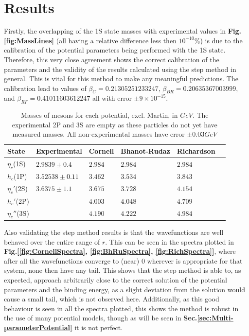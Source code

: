 \documentclass[10pt,twocolumn]{revtex4}    %
\begin{document}
\section{Results} 

Firstly, the overlapping of the 1S state masses with experimental values in \textbf{Fig.\ref{fig:MassLines}} (all having a relative difference less then $10^{-10}\%$) is due to the calibration of the potential parameters being performed with the 1S state. Therefore, this very close agreement shows the correct calibration of the parameters and the validity of the results calculated using the step method in general. This is vital for this method to make any meaningful predictions. The calibration lead to values of $\beta_C= 0.21305251233247$, $\beta_{BR}= 0.20635367003999$, and $\beta_{RF}= 0.41011603612247$ all with error $\pm9\times10^{-15}$.


\begin{center}
    \begin{table}[t]
        \centering
        \begin{tabular}{|l|l|l|l|l|l|}
        \hline
             State   & Experimental & Cornell & Bhanot-Rudaz & Richardson \\ \hline
             $\eta_c$(1S)  & $2.9839\pm0.4$ & $2.984$&  $2.984$& $2.984$   \\ \hline
             $h_c$(1P)     & $3.52538\pm0.11$ & $3.462$ &  $3.534$ & $3.843$ \\ \hline
             $\eta_c'$(2S) & $3.6375\pm1.1$  & $3.675$ &  $3.728$ & $4.154$ \\ \hline
             $h_c'$(2P)    &         & $4.003$ &  $4.048$ & $4.709$\\ \hline
             $\eta_c''$(3S)&         & $4.190$ &  $4.222$ & $4.984$\\ \hline
        \end{tabular}
        \caption{Masses of mesons for each potential, excl. Martin, in $GeV$. The experimental 2P and 3S are empty as these particles do not yet have measured masses. All non-experimental masses have error $\pm0.03GeV$}
        \label{tab:massTable}
    \end{table}
\end{center}

Also validating the step method results is that the wavefunctions are well behaved over the entire range of $r$. This can be seen in the spectra plotted in \textbf{Fig.[\ref{fig:CornellSpectra}, \textbf{\ref{fig:BhRuSpectra}, \ref{fig:RichSpectra}}]}, where after all the wavefunctions converge to (near) $0$ wherever is appropriate for that system, none then have any tail. This shows that the step method is able to, as expected, approach arbitrarily close to the correct solution of the potential parameters and the binding energy, as a slight deviation from the solution would cause a small tail, which is not observed here. Additionally, as this good behaviour is seen in all the spectra plotted, this shows the method is robust in the use of many potential models, though as will be seen in \textbf{Sec.\ref{sec:Multi-parameterPotential}} it is not perfect.
\end{document}
